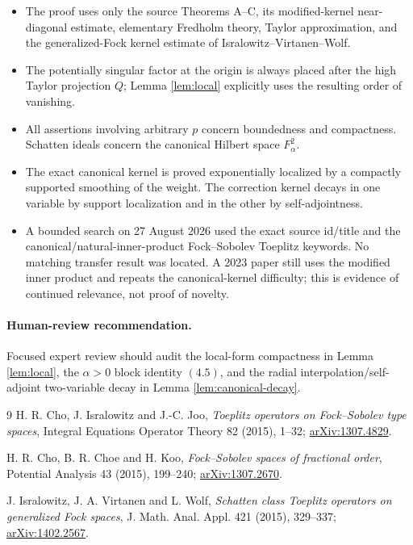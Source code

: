 \documentclass[11pt]{article}
\newcommand{\Fc}[2]{F^{#1}_{#2}}
\begin{document}
\begin{itemize}
\item The proof uses only the source Theorems A--C, its modified-kernel
near-diagonal estimate, elementary Fredholm theory, Taylor approximation, and
the generalized-Fock kernel estimate of Isralowitz--Virtanen--Wolf.
\item The potentially singular factor at the origin is always placed after
the high Taylor projection \(Q\); Lemma \ref{lem:local} explicitly uses the
resulting order of vanishing.
\item All assertions involving arbitrary \(p\) concern boundedness and
compactness.  Schatten ideals concern the canonical Hilbert space
\(\Fc2\alpha\).
\item The exact canonical kernel is proved exponentially localized by a
compactly supported smoothing of the weight.  The correction kernel decays in
one variable by support localization and in the other by self-adjointness.
\item A bounded search on 27 August 2026 used the exact source id/title and
the canonical/natural-inner-product Fock--Sobolev Toeplitz keywords.  No
matching transfer result was located.  A 2023 paper still uses the modified
inner product and repeats the canonical-kernel difficulty; this is evidence
of continued relevance, not proof of novelty.
\end{itemize}

\paragraph{Human-review recommendation.}
Focused expert review should audit the local-form compactness in Lemma
\ref{lem:local}, the \(\alpha>0\) block identity \((4.5)\), and the radial
interpolation/self-adjoint two-variable decay in Lemma
\ref{lem:canonical-decay}.

\begin{thebibliography}{9}
H. R. Cho, J. Isralowitz and J.-C. Joo,
\emph{Toeplitz operators on Fock--Sobolev type spaces},
Integral Equations Operator Theory 82 (2015), 1--32;
\href{https://arxiv.org/abs/1307.4829}{arXiv:1307.4829}.

H. R. Cho, B. R. Choe and H. Koo,
\emph{Fock--Sobolev spaces of fractional order},
Potential Analysis 43 (2015), 199--240;
\href{https://arxiv.org/abs/1307.2670}{arXiv:1307.2670}.

J. Isralowitz, J. A. Virtanen and L. Wolf,
\emph{Schatten class Toeplitz operators on generalized Fock spaces},
J. Math. Anal. Appl. 421 (2015), 329--337;
\href{https://arxiv.org/abs/1402.2567}{arXiv:1402.2567}.
\end{thebibliography}
\end{document}
